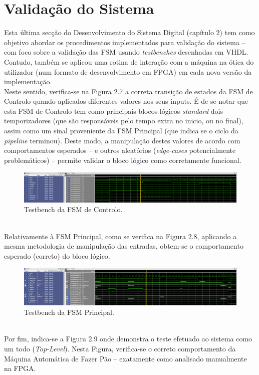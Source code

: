 \documentclass{report}
\begin{document}
\section{Validação do Sistema}
Esta última secção do Desenvolvimento do Sistema Digital (capítulo 2) tem como objetivo abordar os procedimentos implementados para validação do sistema -- com foco sobre a validação das FSM usando \textit{testbenches} desenhadas em VHDL. Contudo, também se aplicou uma rotina de interação com a máquina na ótica do utilizador (num formato de desenvolvimento em FPGA) em cada nova versão da implementação.
\\
Neste sentido, verifica-se na Figura 2.7 a correta transição de estados da FSM de Controlo quando aplicados diferentes valores nos seus inputs. É de se notar que esta FSM de Controlo tem como principais blocos lógicos \textit{standard} dois temporizadores (que são responsáveis pelo tempo extra no inicio, ou no final), assim como um sinal proveniente da FSM Principal (que indica se o ciclo da \textit{pipeline} terminou). Deste modo, a manipulação destes valores de acordo com comportamentos esperados -- e outros aleatórios (\textit{edge-cases} potencialmente problemáticos) -- permite validar o bloco lógico como corretamente funcional.
\begin{figure}[h!] %
	\center
	\includegraphics[width=335pt]{images/FSM1_TB_2}
	\caption{Testbench da FSM de Controlo.}
	\label{fig:imagem7}
\end{figure}
\\
Relativamente à FSM Principal, como se verifica na Figura 2.8, aplicando a mesma metodologia de manipulação das entradas, obtem-se o comportamento esperado (correto) do bloco lógico.
\begin{figure}[h!] %
	\center
	\includegraphics[width=335pt]{images/FSM2_TB_3}
	\caption{Testbench da FSM Principal.}
	\label{fig:imagem8}
\end{figure}
\\
Por fim, indica-se a Figura 2.9 onde demonstra o teste efetuado ao sistema como um todo (\textit{Top-Level}). Nesta Figura, verifica-se o correto comportamento da Máquina Automática de Fazer Pão -- exatamente como analisado manualmente na FPGA.
\end{document}
